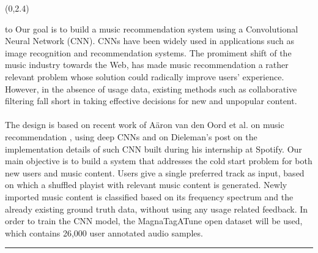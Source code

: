 \documentclass[a0]{a0poster}
\def\Head#1{
  \noindent\hbox to \hsize{\hfil{\LARGE\color{DarkBlue}\sf #1}}\bigskip}
\begin{document}
  \begin{textblock}{7}(0,2.4)
    \Head{Introduction}
    \sf %
    Our goal is to build a music recommendation system using a Convolutional
    Neural Network (CNN). CNNs have been widely used in applications such as
    image recognition and recommendation systems. The promiment shift of the
    music industry towards the Web, has made music recommendation a rather
    relevant problem whose solution could radically improve users' experience.
    However, in the absence of usage data, existing methods such as
    collaborative filtering fall short in taking effective decisions for new
    and unpopular content. \cite{deep-content-based-music-recommendation}
    \\ \\
    The design is based on recent work of A\"{a}ron van den Oord et al. on
    music recommendation \cite{deep-content-based-music-recommendation}, using
    deep CNNs and on Dieleman's post on the implementation details of such CNN
    built during his internship at Spotify. Our main objective is to build a
    system that addresses the cold start problem for both new users and music
    content. Users give a single preferred track as input, based on which a
    shuffled playist with relevant music content is generated. Newly imported
    music content is classified based on its frequency spectrum and the already
    existing ground truth data, without using any usage related feedback. In
    order to train the CNN model, the MagnaTagATune open dataset will be used,
    which contains 26,000 user annotated audio samples.

    \bigskip
    \hrule
  \end{textblock}
\end{document}
